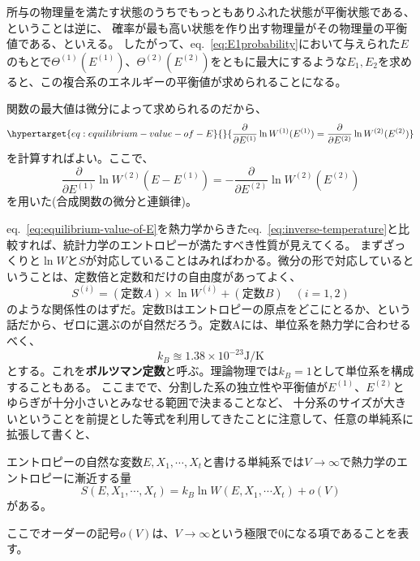 \documentclass[
]{ltjsbook}
\providecommand{\tightlist}{%
  \setlength{\itemsep}{0pt}\setlength{\parskip}{0pt}}
\begin{document}
所与の物理量を満たす状態のうちでもっともありふれた状態が平衡状態である、ということは逆に、
確率が最も高い状態を作り出す物理量がその物理量の平衡値である、といえる。
したがって、eq.~\ref{eq:E1probability}において与えられた\(E\)のもとで\(\Theta^{(1)}(E^{(1)})\)、\(\Theta^{(2)}(E^{(2)})\)をともに最大にするような\(E_1, E_2\)を求めると、この複合系のエネルギーの平衡値が求められることになる。

関数の最大値は微分によって求められるのだから、
\begin{equation}\protect\hypertarget{eq:equilibrium-value-of-E}{}{
\frac{\partial}{\partial E^{(1)}}\ln{W^{(1)}}(E^{(1)})=\frac{\partial}{\partial E^{(2)}}\ln{W^{(2)}}(E^{(2)})
}\label{eq:equilibrium-value-of-E}\end{equation}
を計算すればよい。ここで、 \[
\frac{\partial}{\partial E^{(1)}}\ln{W^{(2)}}(E-E^{(1)})=-\frac{\partial}{\partial E^{(2)}}\ln{W^{(2)}}(E^{(2)})
\] を用いた(合成関数の微分と連鎖律)。

eq.~\ref{eq:equilibrium-value-of-E}を熱力学からきたeq.~\ref{eq:inverse-temperature}と比較すれば、統計力学のエントロピーが満たすべき性質が見えてくる。
まずざっくりと\(\ln{W}\)と\(S\)が対応していることはみればわかる。微分の形で対応しているということは、定数倍と定数和だけの自由度があってよく、
\[
S^{(i)} = (定数A)\times\ln W^{(i)}+(定数B)\quad(i=1, 2)
\]
のような関係性のはずだ。定数Bはエントロピーの原点をどこにとるか、という話だから、ゼロに選ぶのが自然だろう。定数Aには、単位系を熱力学に合わせるべく、
\[
k_B\approxeq1.38\times10^{-23} \text{J/K}
\]
とする。これを\textbf{ボルツマン定数}と呼ぶ。理論物理では\(k_B=1\)として単位系を構成することもある。
ここまでで、分割した系の独立性や平衡値が\(E^{(1)}\)、\(E^{(2)}\)とゆらぎが十分小さいとみなせる範囲で決まることなど、
十分系のサイズが大きいということを前提とした等式を利用してきたことに注意して、任意の単純系に拡張して書くと、

\begin{description}
\tightlist
\item[ボルツマンの定理]
エントロピーの自然な変数\(E, X_1, \cdots, X_t\)と書ける単純系では\(V\to\infty\)で熱力学のエントロピーに漸近する量
\[
S(E, X_1, \cdots, X_t) = k_B\ln{W(E, X_1, \cdots X_t)}+o(V)
\] がある。
\end{description}

ここでオーダーの記号\(o(V)\)は、\(V\to\infty\)という極限で\(0\)になる項であることを表す。
\end{document}
